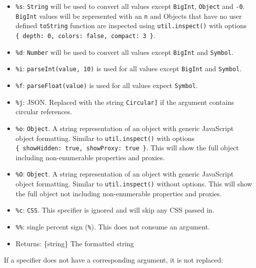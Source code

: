 \begin{itemize}
\tightlist
\item
  \texttt{\%s}: \texttt{String} will be used to convert all values
  except \texttt{BigInt}, \texttt{Object} and \texttt{-0}.
  \texttt{BigInt} values will be represented with an \texttt{n} and
  Objects that have no user defined \texttt{toString} function are
  inspected using \texttt{util.inspect()} with options
  \texttt{\{\ depth:\ 0,\ colors:\ false,\ compact:\ 3\ \}}.
\item
  \texttt{\%d}: \texttt{Number} will be used to convert all values
  except \texttt{BigInt} and \texttt{Symbol}.
\item
  \texttt{\%i}: \texttt{parseInt(value,\ 10)} is used for all values
  except \texttt{BigInt} and \texttt{Symbol}.
\item
  \texttt{\%f}: \texttt{parseFloat(value)} is used for all values expect
  \texttt{Symbol}.
\item
  \texttt{\%j}: JSON. Replaced with the string
  \texttt{\textquotesingle{}{[}Circular{]}\textquotesingle{}} if the
  argument contains circular references.
\item
  \texttt{\%o}: \texttt{Object}. A string representation of an object
  with generic JavaScript object formatting. Similar to
  \texttt{util.inspect()} with options
  \texttt{\{\ showHidden:\ true,\ showProxy:\ true\ \}}. This will show
  the full object including non-enumerable properties and proxies.
\item
  \texttt{\%O}: \texttt{Object}. A string representation of an object
  with generic JavaScript object formatting. Similar to
  \texttt{util.inspect()} without options. This will show the full
  object not including non-enumerable properties and proxies.
\item
  \texttt{\%c}: \texttt{CSS}. This specifier is ignored and will skip
  any CSS passed in.
\item
  \texttt{\%\%}: single percent sign
  (\texttt{\textquotesingle{}\%\textquotesingle{}}). This does not
  consume an argument.
\item
  Returns: \{string\} The formatted string
\end{itemize}

If a specifier does not have a corresponding argument, it is not
replaced:

\begin{Shaded}
\begin{Highlighting}[]
\NormalTok{(}\OperatorTok{,} \NormalTok{)}\OperatorTok{;}
\end{Highlighting}
\end{Shaded}

